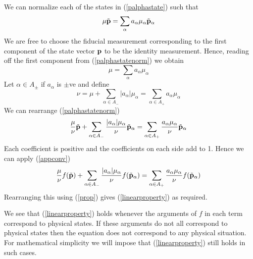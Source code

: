 \documentclass[12pt]{article}
\begin{document}
We can normalize each of the states in (\ref{palphastate}) such that
\begin{equation}\label{palphastatenorm}
\mu\tilde{\bf p}=\sum_\alpha a_\alpha\mu_\alpha \tilde{\bf p}_\alpha
\end{equation}
We are free to choose the fiducial measurement corresponding to the first
component of the state vector ${\bf p}$ to be the identity measurement.
Hence, reading off the first component from (\ref{palphastatenorm}) we
obtain
\begin{equation}
\mu= \sum_\alpha a_\alpha\mu_\alpha
\end{equation}
Let $\alpha\in A_{\pm}$ if $a_\alpha$ is $\pm$ve and define
\begin{equation}
\nu=\mu+\sum_{\alpha\in A_-} |a_\alpha|\mu_\alpha
=\sum_{\alpha\in A_+} a_\alpha \mu_\alpha
\end{equation}
We can rearrange (\ref{palphastatenorm})
\begin{equation}
{\mu\over\nu} \tilde{\bf p} + \sum_{\alpha\in A_-} {|a_\alpha
|\mu_\alpha \over \nu}\tilde{\bf p}_\alpha
=\sum_{\alpha\in A_+} {a_\alpha \mu_\alpha \over \nu}\tilde{\bf p}_\alpha
\end{equation}
Each coefficient is positive and the coefficients on each side add to
1. Hence we can apply (\ref{appconv})
\begin{equation}
{\mu\over\nu} f(\tilde{\bf p}) + \sum_{\alpha\in A_-} {|a_\alpha
|\mu_\alpha \over \nu}f(\tilde{\bf p}_\alpha)
=\sum_{\alpha\in A_+} {a_\alpha \mu_\alpha \over \nu}f(\tilde{\bf
p}_\alpha)
\end{equation}
Rearranging this using (\ref{prop}) gives (\ref{linearproperty}) as required.

We see that (\ref{linearproperty}) holds whenever the
arguments of $f$ in each term correspond to physical states.  If these
arguments do not all correspond to physical states then the equation does
not correspond to any physical situation. For mathematical simplicity we
will impose that (\ref{linearproperty}) still holds in such cases.

\vspace{6mm}


\vspace{6mm}
\end{document}
